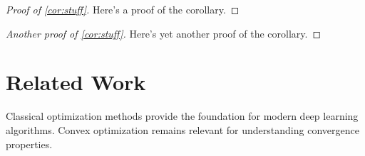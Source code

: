 \documentclass{article}
\begin{document}
\begin{proof}[Proof of \ref{cor:stuff}]
Here's a proof of the corollary.
\end{proof}

\begin{proof}[Another proof of \ref{cor:stuff}]
Here's yet another proof of the corollary.
\end{proof}

\section{Related Work}

Classical optimization methods \cite{polyak1964some, nesterov2003introductory} provide the foundation for modern deep learning algorithms. Convex optimization \cite{boyd2004convex} remains relevant for understanding convergence properties.



\end{document}
